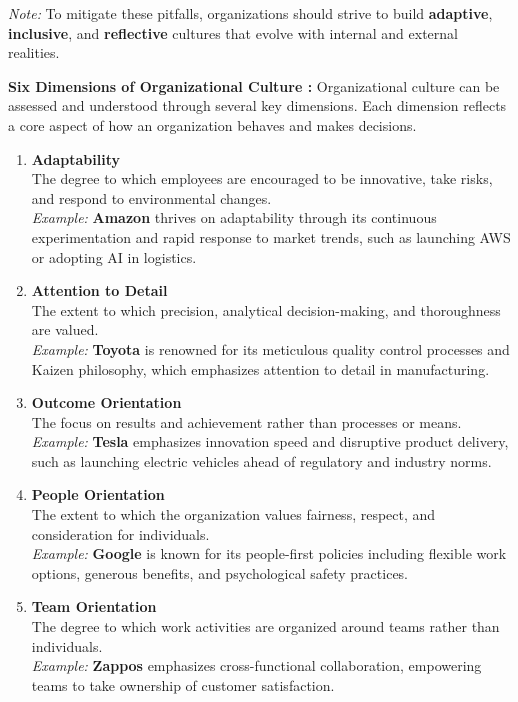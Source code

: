 \documentclass[10pt,a4paper]{book}
\begin{document}
\textit{Note:} To mitigate these pitfalls, organizations should strive to build \textbf{adaptive}, \textbf{inclusive}, and \textbf{reflective} cultures that evolve with internal and external realities.

\vspace{0.5cm}

\textbf{Six Dimensions of Organizational Culture :}
Organizational culture can be assessed and understood through several key dimensions. Each dimension reflects a core aspect of how an organization behaves and makes decisions.

\begin{enumerate}
    \item \textbf{Adaptability} \\
    The degree to which employees are encouraged to be innovative, take risks, and respond to environmental changes. \\
    \textit{Example:} \textbf{Amazon} thrives on adaptability through its continuous experimentation and rapid response to market trends, such as launching AWS or adopting AI in logistics.

    \item \textbf{Attention to Detail} \\
    The extent to which precision, analytical decision-making, and thoroughness are valued.\\
    \textit{Example:} \textbf{Toyota} is renowned for its meticulous quality control processes and Kaizen philosophy, which emphasizes attention to detail in manufacturing.

    \item \textbf{Outcome Orientation} \\
    The focus on results and achievement rather than processes or means. \\
    \textit{Example:} \textbf{Tesla} emphasizes innovation speed and disruptive product delivery, such as launching electric vehicles ahead of regulatory and industry norms.

    \item \textbf{People Orientation} \\
    The extent to which the organization values fairness, respect, and consideration for individuals. \\
    \textit{Example:} \textbf{Google} is known for its people-first policies including flexible work options, generous benefits, and psychological safety practices.

    \item \textbf{Team Orientation} \\
    The degree to which work activities are organized around teams rather than individuals. \\
    \textit{Example:} \textbf{Zappos} emphasizes cross-functional collaboration, empowering teams to take ownership of customer satisfaction.


\end{enumerate}
\end{document}
